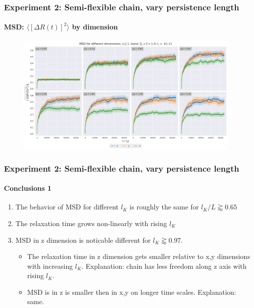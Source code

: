 \documentclass[handout]{beamer}
\newcommand{\mean}[1]{\langle #1 \rangle}
\begin{document}
\begin{frame}
    \frametitle{Experiment 2: Semi-flexible chain, vary persistence length}
    \framesubtitle{MSD: $\mean{[\Delta R(t)]^2}$ by dimension}

    \begin{figure}[h]
        \includegraphics[width=11cm]{./4-exp-msd_by_dim.png}
    \end{figure}
\end{frame}

\begin{frame}
    \frametitle{Experiment 2: Semi-flexible chain, vary persistence length}
    \framesubtitle{Conclusions 1}

    \begin{enumerate}
        \item The behavior of MSD for different $l_K$ is roughly the same for $l_K/L \gtrapprox 0.65$
        \item The relaxation time grows non-linearly with rising $l_K$
        \item MSD in z dimension is noticable different for $l_K \gtrapprox 0.97$. 
        \begin{itemize}
            \item The relaxation time in z dimension gets smaller 
            relative to x,y dimensions with increasing $l_K$. Explanation: chain has less freedom along z axis with rising $l_K$. 
            \item MSD is in z is smaller then in x,y on longer time scales. Explanation: same.
        \end{itemize}
    \end{enumerate}
\end{frame}
\end{document}
